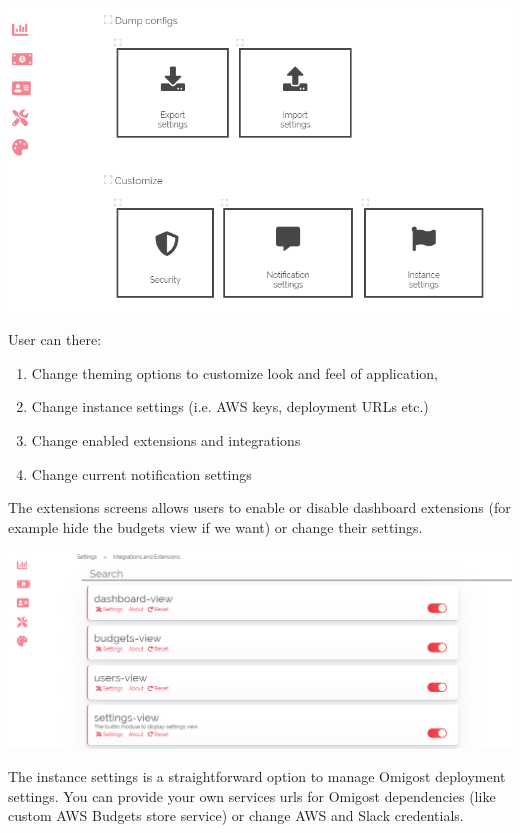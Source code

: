 \documentclass[licencjacka,en]{thesisclass}
\begin{document}
    \includegraphics[width=\textwidth] {imgs/screenshots/screen_customize.png}
    
    User can there:
    \begin{enumerate}
        \item Change theming options to customize look and feel of application,
        \item Change instance settings (i.e. AWS keys, deployment URLs etc.)
        \item Change enabled extensions and integrations
        \item Change current notification settings
    \end{enumerate}
    
    The extensions screens allows users to enable or disable dashboard extensions (for example hide the budgets view if we want) or change their settings.
    
    \includegraphics[width=\textwidth] {imgs/screenshots/screen_customize_extensions.png}
    
    The instance settings is a straightforward option to manage Omigost deployment settings. You can provide your own services urls for Omigost dependencies
    (like custom AWS Budgets store service) or change AWS and Slack credentials.
    
\end{document}
